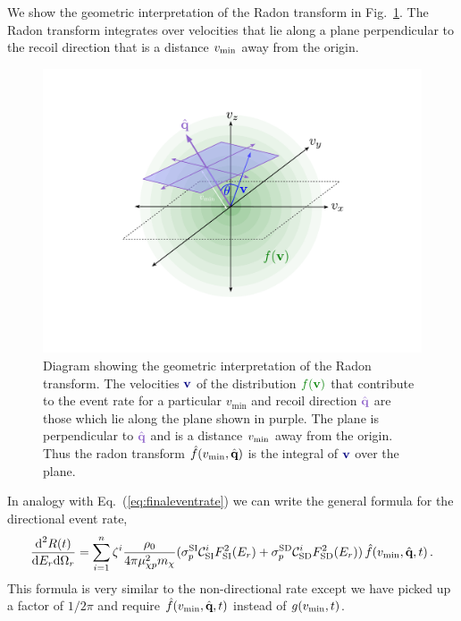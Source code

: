 We show the geometric interpretation of the Radon transform in Fig.~\ref{fig:radontransform}. The Radon transform integrates over velocities that lie along a plane perpendicular to the recoil direction that is a distance $v_\mathrm{min}$ away from the origin.
\begin{figure}
	\centering
	\includegraphics[trim = 20mm 30mm 20mm 20mm, clip, width=\textwidth]{Figures/radontransform.pdf}
	\caption[Diagram showing the geometry of the Radon transform]{Diagram showing the geometric interpretation of the Radon transform. The velocities $\color{blue}{\textbf{v}}$ of the distribution $\color[rgb]{0,0.5,0}{f(\textbf{v})}$ that contribute to the event rate for a particular $v_\textrm{min}$ and recoil direction $\color[rgb]{0.5686    0.4000    0.8000}{\hat{\textbf{q}}}$ are those which lie along the plane shown in purple. The plane is perpendicular to $\color[rgb]{0.5686    0.4000    0.8000}{\hat{\textbf{q}}}$ and is a distance $v_\mathrm{min}$ away from the origin. Thus the radon transform $\hat{f}(v_\mathrm{min},\hat{\textbf{q}})$ is the integral of $\color{blue}{\textbf{v}}$ over the plane.}
	\label{fig:radontransform}
\end{figure}

In analogy with Eq.~(\ref{eq:finaleventrate}) we can write the general formula for the directional event rate,
\begin{equation}\label{eq:finaleventrate-directional}
 \frac{\textrm{d}^2R(t)}{\textrm{d}E_r\textrm{d}\Omega_r} = \sum_{i=1}^n \zeta^i \frac{\rho_0}{4\pi\mu_{\chi p}^2 m_\chi} (\sigma^{\rm SI}_p \mathcal{C}^i_{\textrm{SI}} F^2_{\rm SI}(E_r) + \sigma^{\rm SD}_p \mathcal{C}^i_{\textrm{SD}} F^2_{\rm SD}(E_r))  \, \hat{f}(v_\mathrm{min},\hat{\textbf{q}},t) \, .
\end{equation}
This formula is very similar to the non-directional rate except we have picked up a factor of $1/2\pi$ and require $\hat{f}(v_\mathrm{min},\hat{\textbf{q}},t)$ instead of $g(v_\mathrm{min},t)$.

